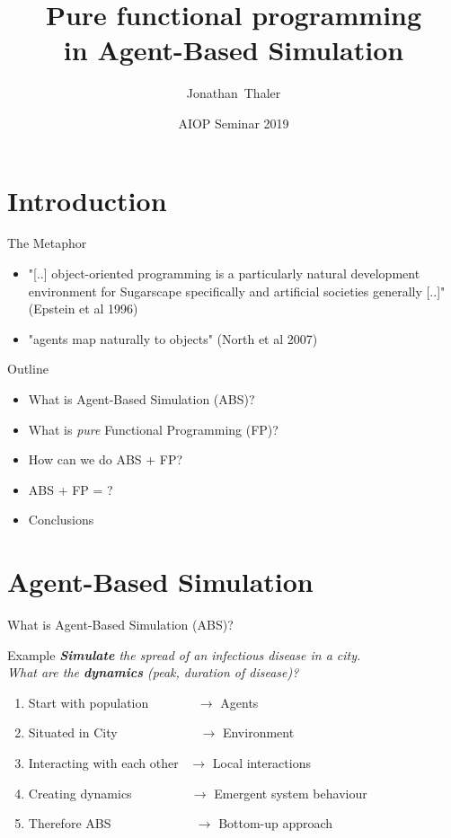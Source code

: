 \documentclass{beamer}
\title[Pure functional programming in Agent-Based Simulation] 
{%
  Pure functional programming \\ in Agent-Based Simulation
}
\author[Thaler]
{
  Jonathan~Thaler
}
\institute[University of Nottingham, Ningbo, China]
{
  University of Nottingham, Ningbo, China
}
\date[AIOP Seminar 2019]
{AIOP Seminar 2019}
\begin{document}
\begin{frame}
  \titlepage
\end{frame}

\section{Introduction}
\begin{frame}{The Metaphor}
\begin{itemize}
  \item "[..] object-oriented programming is a particularly natural development environment for Sugarscape specifically and artificial societies generally [..]" (Epstein et al 1996)
  
  \item "agents map naturally to objects" (North et al 2007)
\end{itemize}
\end{frame}

\begin{frame}{Outline}
\begin{itemize}
  \item What is Agent-Based Simulation (ABS)?
  
  \item What is \textit{pure} Functional Programming (FP)?
  
  \item How can we do ABS + FP?  
  
  \item ABS + FP = ?
  
  \item Conclusions
\end{itemize}
\end{frame}

\section{Agent-Based Simulation}
\begin{frame}{What is Agent-Based Simulation (ABS)?} 
  \begin{block}{Example}
    \textit{\textbf{Simulate} the spread of an infectious disease in a city. \\ What are the \textbf{dynamics} (peak, duration of disease)?}
  \end{block}
  
  \begin{enumerate}
    \item Start with population \, \, \, \, \, \, \, $\to$ Agents
 	\item Situated in City \, \, \, \, \, \, \, \, \, \, \, \,\, $\to$ Environment
 	\item Interacting with each other \, $\to$ Local interactions
 	\item Creating dynamics \, \, \, \, \, \, \, \,\,\, $\to$ Emergent system behaviour
 	\item Therefore ABS \, \, \, \, \, \, \, \, \, \, \, \,\,\, $\to$ Bottom-up approach
  \end{enumerate}
\end{frame}
\end{document}
